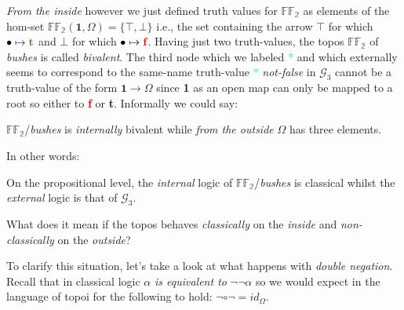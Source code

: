 \newpage

\emph{From the inside} however we just defined truth values for  $\mathbb{FF_2}$ as elements of the hom-set $\mathbb{FF_2}(\textbf{1},\Omega) = \{ \top, \bot\}$ i.e., the set containing the arrow $\top$ for which $\bullet \mapsto \textcolor{OliveGreen}{\textbf{t}}$ and $\bot$ for which $\bullet \mapsto \textcolor{red}{\textbf{f}}$.\newline 
Having just two truth-values, the topos $\mathbb{FF_2}$ of \emph{bushes} is called \emph{bivalent}. \newline 
The third node which we labeled \textcolor{cyan}{$*$} and which externally seems to correspond to the same-name truth-value \textcolor{cyan}{$*$} \emph{not-false} in $\mathcal{G}_3$ cannot be a truth-value of the form $\textbf{1} \rightarrow \Omega$ since \textbf{1} as an open map can only be mapped to a root so either to \textcolor{red}{\textbf{f}} or \textcolor{OliveGreen}{\textbf{t}}.\newline
Informally we could say:
\begin{remark}
	 $\mathbb{FF_2}$/\emph{bushes} is \emph{internally} bivalent while \emph{from the outside} $\Omega$ has three elements.
\end{remark}
In other words:
\begin{remark}
	On the propositional level, the \emph{internal} logic of $\mathbb{FF_2}$/\emph{bushes} is classical whilst the \emph{external} logic is that of $\mathcal{G}_3$.
\end{remark}


What does it mean if the topos behaves \emph{classically} on the \emph{inside} and \emph{non-classically} on the \emph{outside}? 
\newpage

To clarify this situation,
let's take a look at what happens with \emph{double negation}. Recall that in classical logic $\alpha$ \emph{is equivalent to} $\neg \neg \alpha$ so we would expect in the language of topoi for the following to hold: $\neg \circ \neg = id_\Omega$.


